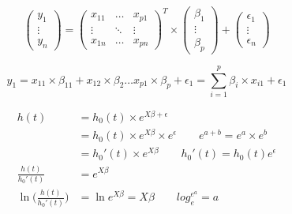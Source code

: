 \documentclass{article}
\begin{document}
\begin{equation}
	\begin{pmatrix}
		y_1 \\ \vdots \\ y_n
	\end{pmatrix} = 
	\begin{pmatrix}
		x_{11} & \ldots & x_{p1} \\ \vdots & \ddots & \vdots \\ x_{1n} & \ldots & x_{pn} 
	\end{pmatrix}^T \times
	\begin{pmatrix}
		\beta_1 \\ \vdots \\ \beta_p
	\end{pmatrix} + 
	\begin{pmatrix}
		\epsilon_1 \\ \vdots \\ \epsilon_n
	\end{pmatrix}
\end{equation}


\begin{equation}
	y_1 = x_{11} \times \beta_{11} + x_{12} \times \beta_2 \ldots  x_{p1} \times \beta_p + \epsilon_1 = \sum_{i=1} ^ p \beta_i\times x_{i1} + \epsilon_1
\end{equation}

\begin{align}
	h(t) &= h_0(t) \times e^{X\beta + \epsilon} \\
	& = h_0(t) \times e^{X\beta} \times e^\epsilon   \quad\quad e^{a+b} = e^a \times e^b  \\
	& = h_0'(t) \times  e^{X\beta} \quad\quad h_0'(t) = h_0(t) e^{\epsilon}\\
	\frac{h(t)}{h_0'(t)} &= e^{X\beta}\\
	\ln \Bigg( \frac{h(t)}{h_0'(t)} \Bigg) & = \ln e^{X\beta} = X\beta \quad\quad log_e^{e^a} = a
\end{align}
	
\end{document}

